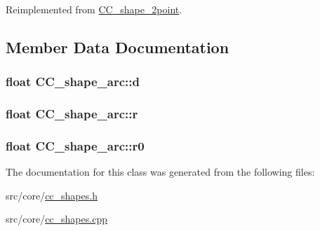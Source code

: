 Reimplemented from \hyperlink{a00039_a5de0c111a1e2e01c7f2802333809b421}{C\-C\-\_\-shape\-\_\-2point}.



\subsection{Member Data Documentation}
\hypertarget{a00041_adc552191491a603591122b01970740d2}{
\subsubsection[{d}]{\setlength{\rightskip}{0pt plus 5cm}float C\-C\-\_\-shape\-\_\-arc\-::d\hspace{0.3cm}{\ttfamily [private]}}}\label{a00041_adc552191491a603591122b01970740d2}
\hypertarget{a00041_a1046b77a88b111d22f31e1d07d9f1139}{
\subsubsection[{r}]{\setlength{\rightskip}{0pt plus 5cm}float C\-C\-\_\-shape\-\_\-arc\-::r\hspace{0.3cm}{\ttfamily [private]}}}\label{a00041_a1046b77a88b111d22f31e1d07d9f1139}
\hypertarget{a00041_a4106c0d55812971a208ab527aeb516ac}{
\subsubsection[{r0}]{\setlength{\rightskip}{0pt plus 5cm}float C\-C\-\_\-shape\-\_\-arc\-::r0\hspace{0.3cm}{\ttfamily [private]}}}\label{a00041_a4106c0d55812971a208ab527aeb516ac}


The documentation for this class was generated from the following files\-:\begin{DoxyCompactItemize}
\item 
src/core/\hyperlink{a00210}{cc\-\_\-shapes.\-h}\item 
src/core/\hyperlink{a00209}{cc\-\_\-shapes.\-cpp}\end{DoxyCompactItemize}
